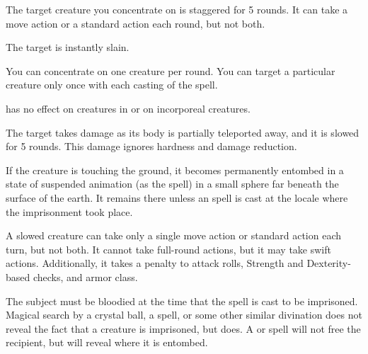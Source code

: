 \spellrng{\rngclose}
\begin{spellhealthy}
  The target creature you concentrate on is staggered for 5 rounds. It can take a move action or a standard action each round, but not both.
\end{spellhealthy}
\begin{spellblood}
  The target is instantly slain.
\end{spellblood}
\begin{spellnotes}
  You can concentrate on one creature per round. You can target a particular creature only once with each casting of the spell.
  \par {} has no effect on creatures in  or on incorporeal creatures.
\end{spellnotes}

\spellrng{\rngclose}
\begin{spelleffect}
  The target takes damage as its body is partially teleported away, and it is slowed for 5 rounds. This damage ignores hardness and damage reduction.
\end{spelleffect}
\begin{spellblood}
  If the creature is touching the ground, it becomes permanently entombed in a state of suspended animation (as the  spell) in a small sphere far beneath the surface of the earth. It remains there unless an  spell is cast at the locale where the imprisonment took place.
\end{spellblood}
\begin{spellnotes}
A slowed creature can take only a single move action or standard action each turn, but not both. It cannot take full-round actions, but it may take swift actions. Additionally, it takes a  penalty to attack rolls, Strength and Dexterity-based checks, and armor class.

  The subject must be bloodied at the time that the spell is cast to be imprisoned. Magical search by a crystal ball, a  spell, or some other similar divination does not reveal the fact that a creature is imprisoned, but  does. A  or  spell will not free the recipient, but will reveal where it is entombed.
\end{spellnotes}

